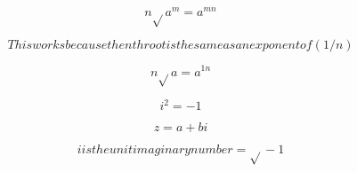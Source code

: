 \[n\sqrt{}a^{m} = a^{mn}\]

\[This works because the nth root is the same as an exponent of (1/n)\]

\[n\sqrt{}a = a^{1n}\]

\[i^{2 }= -1\]

\[z = a + bi\]

\[i is the unit imaginary number = \sqrt{}-1\]

